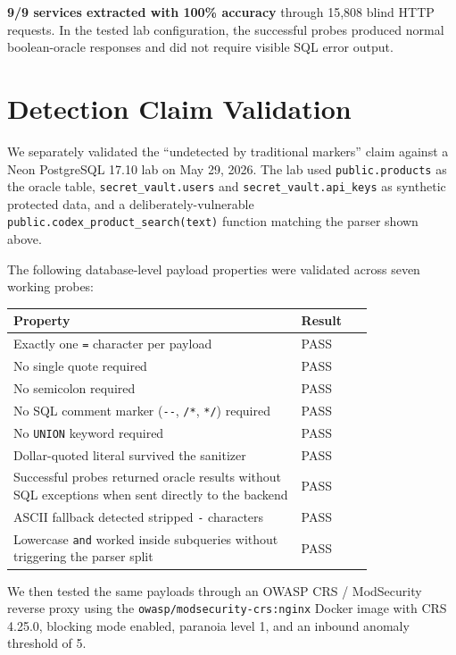 \documentclass[11pt]{article}
\begin{document}
\textbf{9/9 services extracted with 100\% accuracy} through 15,808 blind HTTP
requests. In the tested lab configuration, the successful probes produced normal
boolean-oracle responses and did not require visible SQL error output.

\section{Detection Claim Validation}\label{sec:detection}

We separately validated the ``undetected by traditional markers'' claim against a
Neon PostgreSQL 17.10 lab on May 29, 2026. The lab used \lstinline|public.products|
as the oracle table, \lstinline|secret_vault.users| and
\lstinline|secret_vault.api_keys| as synthetic protected data, and a
deliberately-vulnerable \lstinline|public.codex_product_search(text)| function
matching the parser shown above.

The following database-level payload properties were validated across seven
working probes:

\begin{table}[h]
\centering
\small
\begin{tabular}{@{}>{\raggedright\arraybackslash}p{0.80\linewidth} l@{}}
\toprule
Property & Result \\
\midrule
Exactly one \lstinline|=| character per payload & PASS \\
No single quote required & PASS \\
No semicolon required & PASS \\
No SQL comment marker (\lstinline|--|, \lstinline|/*|, \lstinline|*/|) required & PASS \\
No \lstinline|UNION| keyword required & PASS \\
Dollar-quoted literal survived the sanitizer & PASS \\
Successful probes returned oracle results without SQL exceptions when sent directly to the backend & PASS \\
ASCII fallback detected stripped \lstinline|-| characters & PASS \\
Lowercase \lstinline|and| worked inside subqueries without triggering the parser split & PASS \\
\bottomrule
\end{tabular}
\end{table}

We then tested the same payloads through an OWASP CRS / ModSecurity reverse proxy
using the \lstinline|owasp/modsecurity-crs:nginx| Docker image with CRS 4.25.0,
blocking mode enabled, paranoia level 1, and an inbound anomaly threshold of 5.
\end{document}
